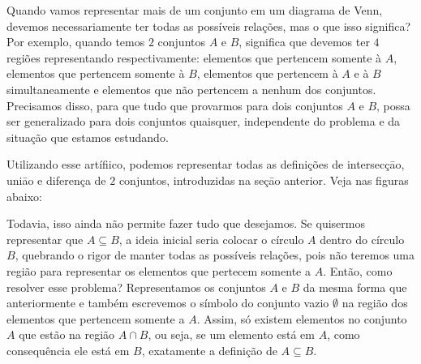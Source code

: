   
  
  Quando vamos representar mais de um conjunto em um diagrama de Venn, devemos necessariamente ter todas as possíveis relações, mas o que isso significa? Por exemplo, quando temos $2$ conjuntos $A$ e $B$, significa que devemos ter $4$ regiões representando respectivamente: elementos que pertencem somente à $A$, elementos que pertencem somente à $B$, elementos que pertencem à $A$ e à $B$ simultaneamente e elementos que não pertencem a nenhum dos conjuntos. Precisamos disso, para que tudo que provarmos para dois conjuntos $A$ e $B$, possa ser generalizado para dois conjuntos quaisquer, independente do problema e da situação que estamos estudando.
  
  Utilizando esse artífiico, podemos representar todas as definições de intersecçāo, uniāo e diferença de $2$ conjuntos, introduzidas na seçāo anterior. Veja nas figuras abaixo:
  
  
  
  
  Todavia, isso ainda não permite fazer tudo que desejamos. Se quisermos representar que $A \subseteq B$, a ideia inicial seria colocar o círculo $A$ dentro do círculo $B$, quebrando o rigor de manter todas as possíveis relações, pois não teremos uma região para representar os elementos que pertecem somente a $A$. Então, como resolver esse problema? Representamos os conjuntos $A$ e $B$ da mesma forma que anteriormente e também escrevemos o símbolo do conjunto vazio $\emptyset$ na região dos elementos que pertencem somente a $A$. Assim, só existem elementos no conjunto $A$ que estão na região $A\cap B$, ou seja, se um elemento está em $A$, como consequência ele está em $B$, exatamente a definição de $A \subseteq B$.
  
